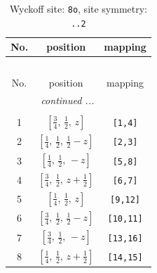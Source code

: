 \documentclass[fleqn,8pt]{jsarticle}
\begin{document}
\begin{longtable}{ccc}
\caption{Wyckoff site: {\tt 8o}, site symmetry: {\tt ..2}}
 \\
 \hline \hline
No. & position & mapping \\ \hline \endfirsthead

\multicolumn{2}{l}{\tablename\ \thetable{}} \\
 \hline \hline
No. & position & mapping \\ \hline \endhead

 \hline \hline
\multicolumn{2}{r}{\footnotesize\it continued ...} \\ \endfoot

 \hline \hline
\multicolumn{2}{r}{} \\ \endlastfoot

1 & $\left[ \frac{3}{4},\, \frac{1}{2},\, z \right]$ & {\tt [1,4]} \\ \hline
2 & $\left[ \frac{1}{4},\, \frac{1}{2},\, \frac{1}{2} - z \right]$ & {\tt [2,3]} \\ \hline
3 & $\left[ \frac{1}{4},\, \frac{1}{2},\, - z \right]$ & {\tt [5,8]} \\ \hline
4 & $\left[ \frac{3}{4},\, \frac{1}{2},\, z + \frac{1}{2} \right]$ & {\tt [6,7]} \\ \hline
5 & $\left[ \frac{1}{4},\, \frac{1}{2},\, z \right]$ & {\tt [9,12]} \\ \hline
6 & $\left[ \frac{3}{4},\, \frac{1}{2},\, \frac{1}{2} - z \right]$ & {\tt [10,11]} \\ \hline
7 & $\left[ \frac{3}{4},\, \frac{1}{2},\, - z \right]$ & {\tt [13,16]} \\ \hline
8 & $\left[ \frac{1}{4},\, \frac{1}{2},\, z + \frac{1}{2} \right]$ & {\tt [14,15]} \\
\end{longtable}
\renewcommand{\arraystretch}{1.2}
\end{document}
